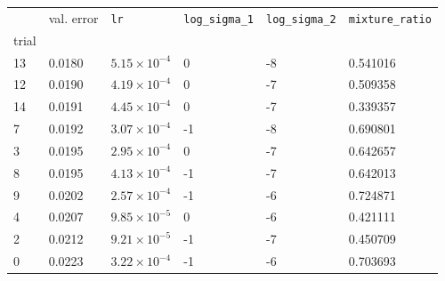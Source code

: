 \begin{tabular}{lp{2cm}p{2cm}p{2cm}p{2cm}p{2cm}}
\toprule
{} &  val. error &         \texttt{lr} &  \texttt{log\_sigma\_1} &  \texttt{log\_sigma\_2} &  \texttt{mixture\_ratio} \\
trial &             &                     &                         &                         &                          \\
\midrule
13    &      0.0180 & $5.15\times10^{-4}$ &                       0 &                      -8 &                 0.541016 \\
12    &      0.0190 & $4.19\times10^{-4}$ &                       0 &                      -7 &                 0.509358 \\
14    &      0.0191 & $4.45\times10^{-4}$ &                       0 &                      -7 &                 0.339357 \\
7     &      0.0192 & $3.07\times10^{-4}$ &                      -1 &                      -8 &                 0.690801 \\
3     &      0.0195 & $2.95\times10^{-4}$ &                       0 &                      -7 &                 0.642657 \\
8     &      0.0195 & $4.13\times10^{-4}$ &                      -1 &                      -7 &                 0.642013 \\
9     &      0.0202 & $2.57\times10^{-4}$ &                      -1 &                      -6 &                 0.724871 \\
4     &      0.0207 & $9.85\times10^{-5}$ &                       0 &                      -6 &                 0.421111 \\
2     &      0.0212 & $9.21\times10^{-5}$ &                      -1 &                      -7 &                 0.450709 \\
0     &      0.0223 & $3.22\times10^{-4}$ &                      -1 &                      -6 &                 0.703693 \\
\bottomrule
\end{tabular}
